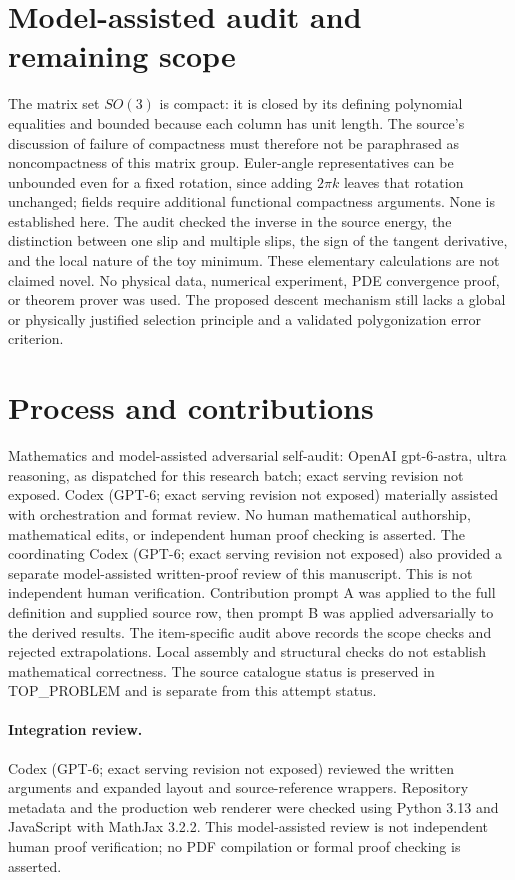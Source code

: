 \documentclass[11pt]{article}
\begin{document}
\section{Model-assisted audit and remaining scope}
The matrix set $SO(3)$ is compact: it is closed by its defining polynomial
equalities and bounded because each column has unit length. The source's
discussion of failure of compactness must therefore not be paraphrased as
noncompactness of this matrix group. Euler-angle representatives can be
unbounded even for a fixed rotation, since adding $2\pi k$ leaves that
rotation unchanged; fields require additional functional compactness
arguments. None is established here. The audit checked the inverse in the
source energy, the distinction between one slip and multiple slips, the
sign of the tangent derivative, and the local nature of the toy minimum.
These elementary calculations are not claimed novel. No physical data,
numerical experiment, PDE convergence proof, or theorem prover was used.
The proposed descent mechanism still lacks a global or physically justified
selection principle and a validated polygonization error criterion.

\section{Process and contributions}
Mathematics and model-assisted adversarial self-audit: OpenAI gpt-6-astra, ultra reasoning, as dispatched for this research batch; exact serving revision not exposed. Codex (GPT-6; exact serving revision not exposed) materially assisted with orchestration and format review. No human mathematical authorship, mathematical edits, or independent human proof checking is asserted.
The coordinating Codex (GPT-6; exact serving revision not exposed) also provided a separate model-assisted written-proof review of this manuscript. This is not independent human verification.
Contribution prompt A was applied to the full definition and supplied source row, then prompt B was applied adversarially to the derived results. The item-specific audit above records the scope checks and rejected extrapolations. Local assembly and structural checks do not establish mathematical correctness. The source catalogue status is preserved in TOP\_PROBLEM and is separate from this attempt status.
\paragraph{Integration review.} Codex (GPT-6; exact serving revision not exposed) reviewed the written arguments and expanded layout and source-reference wrappers. Repository metadata and the production web renderer were checked using Python 3.13 and JavaScript with MathJax 3.2.2. This model-assisted review is not independent human proof verification; no PDF compilation or formal proof checking is asserted.
\end{document}
